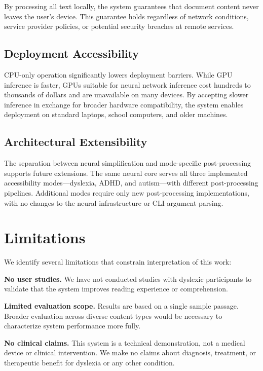 \documentclass[11pt]{article}
\begin{document}
By processing all text locally, the system guarantees that document content never leaves the user's device. This guarantee holds regardless of network conditions, service provider policies, or potential security breaches at remote services.

\subsection{Deployment Accessibility}

CPU-only operation significantly lowers deployment barriers. While GPU inference is faster, GPUs suitable for neural network inference cost hundreds to thousands of dollars and are unavailable on many devices. By accepting slower inference in exchange for broader hardware compatibility, the system enables deployment on standard laptops, school computers, and older machines.

\subsection{Architectural Extensibility}

The separation between neural simplification and mode-specific post-processing supports future extensions. The same neural core serves all three implemented accessibility modes---dyslexia, ADHD, and autism---with different post-processing pipelines. Additional modes require only new post-processing implementations, with no changes to the neural infrastructure or CLI argument parsing.

\section{Limitations}

We identify several limitations that constrain interpretation of this work:

\textbf{No user studies.} We have not conducted studies with dyslexic participants to validate that the system improves reading experience or comprehension.

\textbf{Limited evaluation scope.} Results are based on a single sample passage. Broader evaluation across diverse content types would be necessary to characterize system performance more fully.

\textbf{No clinical claims.} This system is a technical demonstration, not a medical device or clinical intervention. We make no claims about diagnosis, treatment, or therapeutic benefit for dyslexia or any other condition.
\end{document}
